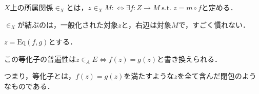 \documentclass[uplatex, dvipdfmx]{jsarticle}
\begin{document}
\begin{definition*}
    $X$上の所属関係$\in_X$とは，$z\in_XM:\Leftrightarrow \exists f:Z\to M\;\mathrm{s.t.}\; z=m\circ f$と定める．
    \begin{center}
    \end{center}
\end{definition*}
\begin{remark*}
    $\in_X$が結ぶのは，一般化された対象$z$と，右辺は対象$M$で，すごく慣れない．
\end{remark*}

\begin{example}[等化子の普遍性を局所包含関係の言葉で書き換えられる．]
    $z=\mathrm{Eq}(f,g)$とする．
    \begin{center}
    \end{center}
    この等化子の普遍性は$z\in_AE\Leftrightarrow f(z)=g(z)$と書き換えられる．
    \begin{center}
    \end{center}
    つまり，等化子とは，$f(z)=g(z)$を満たすような$z$を全て含んだ閉包のようなものである．
\end{example}
\end{document}
